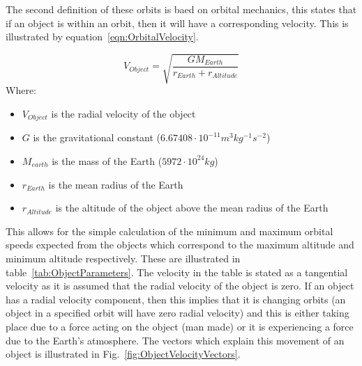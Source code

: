 \documentclass[11pt]{witseiepaper}
\begin{document}
The second definition of these orbits is baed on orbital mechanics, this states that if an object is within an orbit, then it will have a corresponding velocity.
This is illustrated by equation~\ref{eqn:OrbitalVelocity}. 

\begin{equation} \label{eqn:OrbitalVelocity}
    V_{Object} = \sqrt{\frac{G M_{Earth}}{r_{Earth} + r_{Altitude}}}
\end{equation}
Where:
\begin{itemize}
    \item $V_{Object}$ is the radial velocity of the object
    \item $G$ is the gravitational constant ($6.67408 \cdot 10^{-11} m^3 kg^{-1} s^{-2}$)
    \item $M_{earth}$ is the mass of the Earth ($5972 \cdot 10^{24} kg$)
    \item $r_{Earth}$ is the mean radius of the Earth
    \item $r_{Altitude}$ is the altitude of the object above the mean radius of the Earth
\end{itemize}

This allows for the simple calculation of the minimum and maximum orbital speeds expected from the objects which correspond to the maximum altitude and minimum altitude respectively. These are illustrated in table~\ref{tab:ObjectParameters}. The velocity in the table is stated as a tangential velocity as it is assumed that the radial velocity of the object is zero. If an object has a radial velocity component, then this implies that it is changing orbits (an object in a specified orbit will have zero radial velocity) and this is either taking place due to a force acting on the object (man made) or it is experiencing a force due to the Earth's atmosphere. The vectors which explain this movement of an object is illustrated in Fig.~\ref{fig:ObjectVelocityVectors}.
\end{document}
